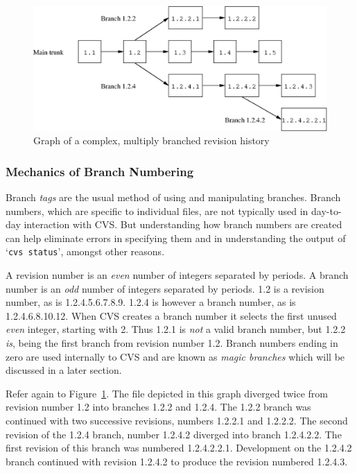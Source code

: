\documentclass[12pt,letterpaper]{article}
\newcommand{\cmd}[1]{`\texttt{#1}'}
\begin{document}
\begin{figure}[htb]
\begin{center}
\includegraphics[width=\textwidth]{revhist-complex.eps}
\end{center}
\caption{Graph of a complex, multiply branched revision history}
\label{fig:revhist-complex}
\end{figure}

\subsubsection{Mechanics of Branch Numbering}

Branch \emph{tags} are the usual method of using and manipulating branches.
Branch numbers, which are specific to individual files, are not typically used
in day-to-day interaction with CVS.  But understanding how branch numbers are
created can help eliminate errors in specifying them and in understanding the
output of \cmd{cvs status}, amongst other reasons.

A revision number is an \emph{even} number of integers separated by periods.
A branch number is an \emph{odd} number of integers separated by periods.  1.2
is a revision number, as is 1.2.4.5.6.7.8.9.  1.2.4 is however a branch
number, as is 1.2.4.6.8.10.12.  When CVS creates a branch number it selects
the first unused \emph{even} integer, starting with 2.  Thus 1.2.1 is
\emph{not} a valid branch number, but 1.2.2 \emph{is}, being the first branch
from revision number 1.2.  Branch numbers ending in zero are used internally
to CVS and are known as \emph{magic branches} which will be discussed in a
later section.

Refer again to Figure~\ref{fig:revhist-complex}.  The file depicted in this
graph diverged twice from revision number 1.2 into branches 1.2.2 and 1.2.4.
The 1.2.2 branch was continued with two successive revisions, numbers 1.2.2.1
and 1.2.2.2. The second revision of the 1.2.4 branch, number 1.2.4.2 diverged
into branch 1.2.4.2.2.  The first revision of this branch was numbered
1.2.4.2.2.1.  Development on the 1.2.4.2 branch continued with revision
1.2.4.2 to produce the revision numbered 1.2.4.3.
\end{document}
